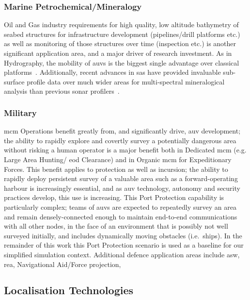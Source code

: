 \subsubsection{Marine Petrochemical/Mineralogy}
Oil and Gas industry requirements for high quality, low altitude bathymetry of seabed structures for infrastructure development (pipelines/drill platforms etc.) as well as monitoring of those structures over time (inspection etc.) is another significant application area, and a major driver of research investment.
As in Hydrography, the mobility of \glspl{auv} is the biggest single advantage over classical platforms~\cite{Morr2003}.
Additionally, recent advances in \gls{sas} have provided invaluable sub-surface profile data over much wider areas for multi-spectral mineralogical analysis than previous sonar profilers~\cite{Denny2015}.

\subsubsection{Military}
\gls{mcm} Operations benefit greatly from, and significantly drive, \gls{auv} development; the ability to rapidly explore and covertly survey a potentially dangerous area without risking a human operator is a major benefit both in Dedicated \gls{mcm} (e.g. Large Area Hunting/ \gls{eod} Clearance) and in Organic \gls{mcm} for Expeditionary Forces.
This benefit applies to protection as well as incursion; the ability to rapidly deploy persistent survey of a valuable area such as a forward-operating harbour is increasingly essential, and as \gls{auv} technology, autonomy and security practices develop, this use is increasing.
This Port Protection capability is particularly complex;  teams of \glspl{auv} are expected to repeatedly survey an area and remain densely-connected enough to maintain end-to-end communications with all other nodes, in the face of an environment that is possibly not well surveyed initially, and includes dynamically moving obstacles (i.e.\ ships).
In the remainder of this work this Port Protection scenario is used as a baseline for our simplified simulation context.
Additional defence application areas include \gls{asw}, \gls{rea}, Navigational Aid/Force projection, 



\subsection{Localisation Technologies}


